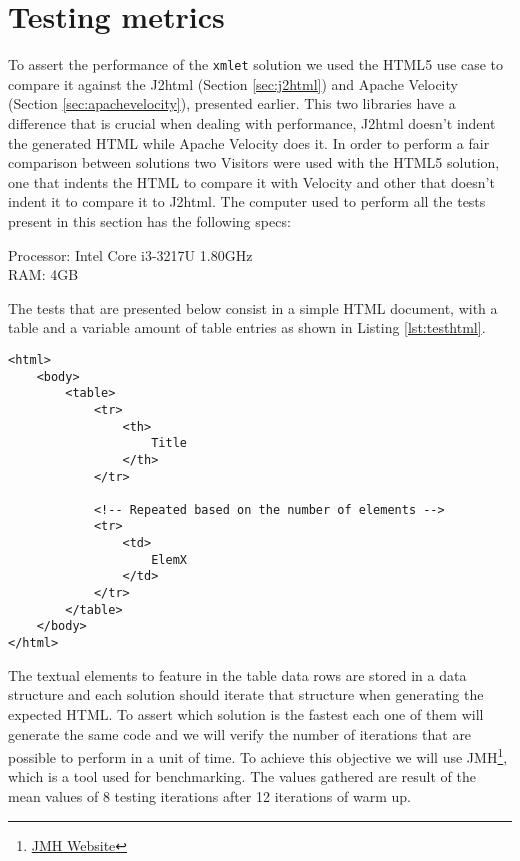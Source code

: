 \section{Testing metrics} %
\label{sec:testingmetrics}

To assert the performance of the \texttt{xmlet} solution we used the \ac{HTML}5 use case to compare it against the J2html (Section \ref{sec:j2html}) and Apache Velocity (Section \ref{sec:apachevelocity}), presented earlier. This two libraries have a difference that is crucial when dealing with performance, J2html doesn't indent the generated \ac{HTML} while Apache Velocity does it. In order to perform a fair comparison between solutions two Visitors were used with the \ac{HTML}5 solution, one that indents the \ac{HTML} to compare it with Velocity and other that doesn't indent it to compare it to J2html. The computer used to perform all the tests present in this section has the following specs:

Processor: Intel Core i3-3217U 1.80GHz\\
RAM: 4GB

\noindent
The tests that are presented below consist in a simple \ac{HTML} document, with a table and a variable amount of table entries as shown in Listing \ref{lst:testhtml}. 

\lstset{language=html}

\begin{minipage}{\linewidth}
\begin{lstlisting}[caption={Test HTML}, label={lst:testhtml}]
<html>
    <body>
        <table>
            <tr>
                <th>
                    Title
                </th>
            </tr>
            
            <!-- Repeated based on the number of elements -->
            <tr>
                <td>
                    ElemX
                </td>
            </tr>
        </table>
    </body>
</html>
\end{lstlisting}
\end{minipage}

The textual elements to feature in the table data rows are stored in a data structure and each solution should iterate that structure when generating the expected \ac{HTML}. To assert which solution is the fastest each one of them will generate the same code and we will verify the number of iterations that are possible to perform in a unit of time. To achieve this objective we will use \ac{JMH}\footnote{\href{http://openjdk.java.net/projects/code-tools/jmh/}{JMH Website}}, which is a tool used for benchmarking. The values gathered are result of the mean values of 8 testing iterations after 12 iterations of warm up. 

